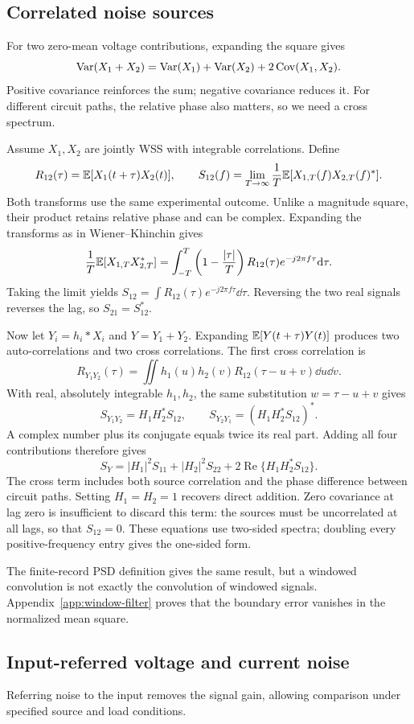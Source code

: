\subsection{Correlated noise sources}
For two zero-mean voltage contributions, expanding the square gives
\[
\operatorname{Var}(X_1+X_2)=\operatorname{Var}(X_1)+\operatorname{Var}(X_2)+2\operatorname{Cov}(X_1,X_2).
\]
Positive covariance reinforces the sum; negative covariance reduces it. For different circuit paths, the relative phase also matters, so we need a cross spectrum.

Assume $X_1,X_2$ are jointly WSS with integrable correlations. Define
\[
R_{12}(\tau)=\mathbb E[X_1(t+\tau)X_2(t)],\qquad
S_{12}(f)=\lim_{T\to\infty}\frac1T\mathbb E[X_{1,T}(f)X_{2,T}(f)^*].
\]
Both transforms use the same experimental outcome. Unlike a magnitude square, their product retains relative phase and can be complex. Expanding the transforms as in Wiener--Khinchin gives
\[
\frac1T\mathbb E[X_{1,T}X_{2,T}^*]
=\int_{-T}^T\left(1-\frac{|\tau|}{T}\right)R_{12}(\tau)e^{-j2\pi f\tau}\mathrm d\tau.
\]
Taking the limit yields $S_{12}=\int R_{12}(\tau)e^{-j2\pi f\tau}\dd\tau$. Reversing the two real signals reverses the lag, so $S_{21}=S_{12}^*$.

Now let $Y_i=h_i*X_i$ and $Y=Y_1+Y_2$. Expanding $\mathbb E[Y(t+\tau)Y(t)]$ produces two auto-correlations and two cross correlations. The first cross correlation is
\[
R_{Y_1Y_2}(\tau)=\iint h_1(u)h_2(v)R_{12}(\tau-u+v)\dd u\dd v.
\]
With real, absolutely integrable $h_1,h_2$, the same substitution $w=\tau-u+v$ gives
\[
S_{Y_1Y_2}=H_1H_2^*S_{12},\qquad S_{Y_2Y_1}=(H_1H_2^*S_{12})^*.
\]
A complex number plus its conjugate equals twice its real part. Adding all four contributions therefore gives
\begin{equation}
\boxed{S_Y=|H_1|^2S_{11}+|H_2|^2S_{22}
+2\operatorname{Re}\{H_1H_2^*S_{12}\}.}
\label{eq:cross}
\end{equation}
The cross term includes both source correlation and the phase difference between circuit paths. Setting $H_1=H_2=1$ recovers direct addition. Zero covariance at lag zero is insufficient to discard this term: the sources must be uncorrelated at all lags, so that $S_{12}=0$. These equations use two-sided spectra; doubling every positive-frequency entry gives the one-sided form.

The finite-record PSD definition gives the same result, but a windowed convolution is not exactly the convolution of windowed signals. Appendix~\ref{app:window-filter} proves that the boundary error vanishes in the normalized mean square.

\subsection{Input-referred voltage and current noise}
Referring noise to the input removes the signal gain, allowing comparison under specified source and load conditions.
\label{sec:input-referred}


